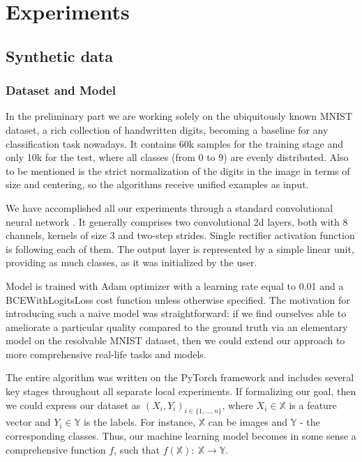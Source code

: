 \documentclass{article}
\begin{document}
\section{Experiments}
\subsection{Synthetic data}

\subsubsection{Dataset and Model}

In the preliminary part we are working solely on the ubiquitously known MNIST dataset, a rich collection of handwritten digits, becoming a baseline for any classification task nowadays. It contains 60k samples for the training stage and only 10k for the test, where all classes (from 0 to 9) are evenly distributed. Also to be mentioned is the strict normalization of the digits in the image in terms of size and centering, so the algorithms receive unified examples as input.

We have accomplished all our experiments through a standard convolutional neural network \cite{cnn}. It generally comprises two convolutional 2d layers, both with 8 channels, kernels of size 3 and two-step strides. Single rectifier activation function is following each of them.  The output layer is represented by a simple linear unit, providing as much classes, as it was initialized by the user.   

Model is trained with Adam optimizer with a learning rate equal to 0.01 and a BCEWithLogitsLoss cost function unless otherwise specified. The motivation for introducing such a naive model was straightforward: if we find ourselves able to ameliorate a particular quality compared to the ground truth via an elementary model on the resolvable MNIST dataset, then we could extend our approach to more comprehensive real-life tasks and models.

The entire algorithm was written on the PyTorch framework and includes several key stages throughout all separate local experiments. If formalizing our goal, then we could express our dataset as $(X_i, Y_i)_{i\in\{1, ..., n\}}$, where $X_i \in \mathbb{X}$ is a feature vector and  $Y_i \in \mathbb{Y}$ is the labels. For instance, $\mathbb{X}$ can be images and $\mathbb{Y}$ - the corresponding classes. Thus, our machine learning model becomes in some sense a comprehensive function $f$, such that $f(\mathbb{X}): \  \mathbb{X} \rightarrow \mathbb{Y}$.
\end{document}
